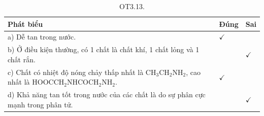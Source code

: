\documentclass[10pt]{article}
\begin{document}
\begin{table}[h]
\begin{center}
\captionsetup{labelformat=empty}
\caption{OT3.13.}
\begin{tabular}{|l|l|l|}
\hline
Phát biểu & Đúng & Sai \\
\hline
a) Dễ tan trong nước. & $\checkmark$ &  \\
\hline
b) Ở điều kiện thường, có 1 chất là chất khí, 1 chất lỏng và 1 chất rắn. &  & $\checkmark$ \\
\hline
c) Chất có nhiệt độ nóng chảy thấp nhất là $\mathrm{CH}_{3} \mathrm{CH}_{2} \mathrm{NH}_{2}$, cao nhất là $\mathrm{HOOCCH}_{2} \mathrm{NHCOCH}_{2} \mathrm{NH}_{2}$. & $\checkmark$ &  \\
\hline
d) Khả năng tan tốt trong nước của các chất là do sự phân cực mạnh trong phân tử. &  & $\checkmark$ \\
\hline
\end{tabular}
\end{center}
\end{table}
\end{document}
